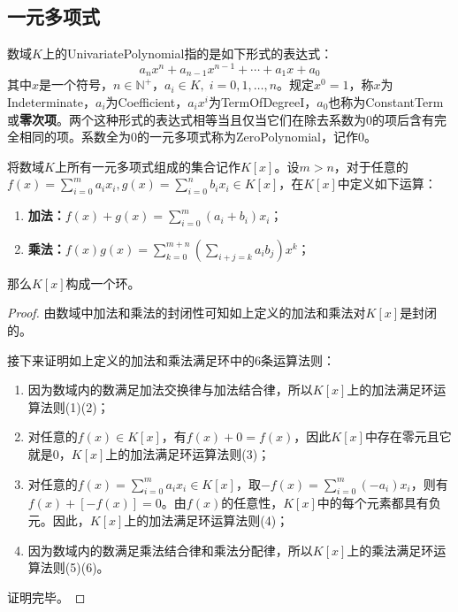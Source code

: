 \subsection{一元多项式}
\begin{definition}
	数域$K$上的\gls{UnivariatePolynomial}指的是如下形式的表达式：
	\begin{equation*}
		a_nx^n+a_{n-1}x^{n-1}+\cdots+a_1x+a_0
	\end{equation*}
	其中$x$是一个符号，$n\in\mathbb{N}^+$，$a_i\in K,\;i=0,1,\dots,n$。规定$x^0=1$，称$x$为\gls{Indeterminate}，$a_i$为\gls{Coefficient}，$a_ix^i$为\gls{TermOfDegreeI}，$a_0$也称为\gls{ConstantTerm}或\textbf{零次项}。两个这种形式的表达式相等当且仅当它们在除去系数为$0$的项后含有完全相同的项。系数全为$0$的一元多项式称为\gls{ZeroPolynomial}，记作$0$。
\end{definition}
\begin{definition}
	将数域$K$上所有一元多项式组成的集合记作$K[x]$。设$m>n$，对于任意的$f(x)=\sum\limits_{i=0}^{m}a_ix_i,g(x)=\sum\limits_{i=0}^{n}b_ix_i\in K[x]$，在$K[x]$中定义如下运算：
	\begin{enumerate}
		\item \textbf{加法：}$f(x)+g(x)=\sum\limits_{i=0}^{m}(a_i+b_i)x_i$；
		\item \textbf{乘法：}$f(x)g(x)=\sum\limits_{k=0}^{m+n}\left(\sum\limits_{i+j=k}a_ib_j\right)x^k$；
	\end{enumerate}
	那么$K[x]$构成一个环。
\end{definition}
\begin{proof}
	由数域中加法和乘法的封闭性可知如上定义的加法和乘法对$K[x]$是封闭的。\par
	接下来证明如上定义的加法和乘法满足环中的$6$条运算法则：
	\begin{enumerate}
		\item 因为数域内的数满足加法交换律与加法结合律，所以$K[x]$上的加法满足环运算法则(1)(2)；
		\item 对任意的$f(x)\in K[x]$，有$f(x)+0=f(x)$，因此$K[x]$中存在零元且它就是$0$，$K[x]$上的加法满足环运算法则(3)；
		\item 对任意的$f(x)=\sum\limits_{i=0}^{m}a_ix_i\in K[x]$，取$-f(x)=\sum\limits_{i=0}^{m}(-a_i)x_i$，则有$f(x)+[-f(x)]=0$。由$f(x)$的任意性，$K[x]$中的每个元素都具有负元。因此，$K[x]$上的加法满足环运算法则(4)；
		\item 因为数域内的数满足乘法结合律和乘法分配律，所以$K[x]$上的乘法满足环运算法则(5)(6)。
	\end{enumerate}
	证明完毕。
\end{proof}

